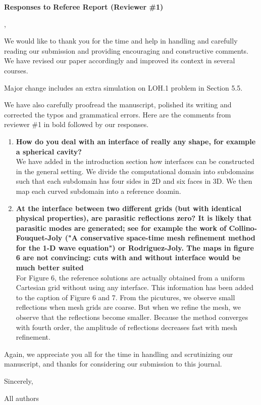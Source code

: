 \documentclass[twoside,11pt]{article}
\begin{document}
\begin{center}
{\Large \textbf{Responses to Referee Report (Reviewer \#1)}}
\end{center}

,

We would like to thank you for the time and help in handling and carefully reading our submission and providing encouraging and constructive comments.  We have revised our paper accordingly and improved its context in several courses. 

Major change includes an extra simulation on LOH.1 problem in Section 5.5.

We have also carefully proofread the manuscript, polished its writing and corrected the typos and grammatical errors.  Here are the comments from reviewer \#1 in bold followed by our responses.

\begin{enumerate}
\item \textbf{How do you deal with an interface of really any shape, for example a spherical cavity?}\\
 We have added in the introduction section how interfaces can be constructed in the general setting. We divide the computational domain into subdomains such that each subdomain has four sides in 2D and six faces in 3D. We then map each curved subdomain into a reference doamin.

\item  \textbf{At the interface between two different grids (but with identical physical properties), are parasitic reflections zero? It is likely that parasitic modes are generated; see for example the work of Collino-Fouquet-Joly ("A conservative space-time mesh refinement method for the 1-D wave equation") or Rodriguez-Joly. The maps in figure 6 are not convincing: cuts with and without interface would be much better suited}\\
 For Figure 6, the reference solutions are actually obtained from a uniform Cartesian grid without using any interface. This information has been added to the caption of Figure 6 and 7. From the picutures, we observe small reflections when mesh grids are coarse. But when we refine the mesh, we observe that the reflections become smaller. Because the method converges with fourth order, the amplitude of reflections decreases fast with mesh refinement. %

\end{enumerate}

Again, we appreciate you all for the time in handling and scrutinizing our manuscript, and thanks for considering our submission to this journal.

Sincerely, 

All authors
\end{document}

